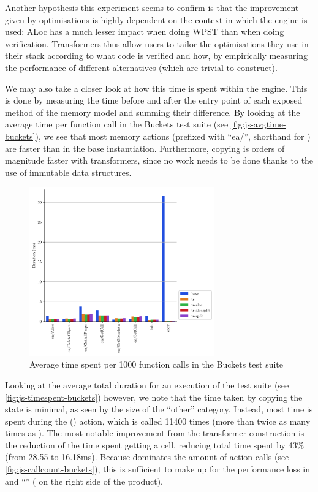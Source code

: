 Another hypothesis this experiment seems to confirm is that the improvement given by optimisations is highly dependent on the context in which the engine is used: ALoc has a much lesser impact when doing WPST than when doing verification. Transformers thus allow users to tailor the optimisations they use in their stack according to what code is verified and how, by empirically measuring the performance of different alternatives (which are trivial to construct).

We may also take a closer look at how this time is spent within the engine. This is done by measuring the time before and after the entry point of each exposed method of the memory model and summing their difference. By looking at the average time per function call in the Buckets test suite (see \autoref{fig:js-avgtime-buckets}), we see that most memory actions (prefixed with ``ea/'', shorthand for \execac) are faster than in the base instantiation. Furthermore, copying is orders of magnitude faster with transformers, since no work needs to be done thanks to the use of immutable data structures.

\begin{figure}
	\centering
	\includegraphics[width=8cm]{figures/js/buckets_avg_action_duration}
	\caption{Average time spent per 1000 function calls in the Buckets test suite}
	\label{fig:js-avgtime-buckets}
\end{figure}%

Looking at the average total duration for an execution of the test suite (see \autoref{fig:js-timespent-buckets}) however, we note that the time taken by copying the state is minimal, as seen by the size of the ``other'' category. Instead, most time is spent during the \load{} () action, which is called 11400 times (more than twice as many times as \store{}). The most notable improvement from the transformer construction is the reduction of the time spent getting a cell, reducing total time spent by 43\% (from 28.55 to 16.18ms). Because \load{} dominates the amount of action calls (see \autoref{fig:js-callcount-buckets}), this is sufficient to make up for the performance loss in \store{} and ``'' (\load{} on the right side of the product).

